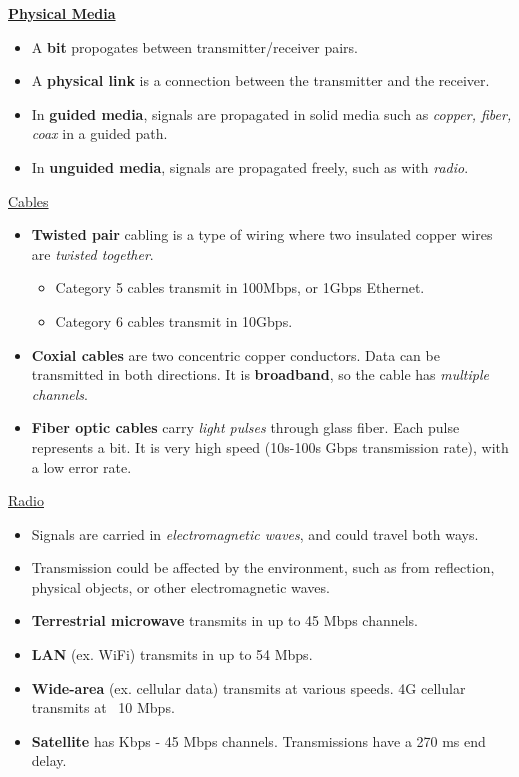 \documentclass{article}
\begin{document}
\underline{\bf Physical Media}

\begin{itemize}
\item A {\bf bit} propogates between transmitter/receiver pairs.
\item A {\bf physical link} is a connection between the transmitter and the receiver.
\item In {\bf guided media}, signals are propagated in solid media such as {\it copper, fiber, coax} in a guided path.
\item In {\bf unguided media}, signals are propagated freely, such as with {\it radio}.
\end{itemize}

\underline{Cables}

\begin{itemize}
\item {\bf Twisted pair} cabling is a type of wiring where two insulated copper wires are {\it twisted together}.
\begin{itemize}
\item Category 5 cables transmit in 100Mbps, or 1Gbps Ethernet.
\item Category 6 cables transmit in 10Gbps.
\end{itemize}
\item {\bf Coxial cables} are two concentric copper conductors. Data can be transmitted in both directions. It is {\bf broadband}, so the cable has {\it multiple channels}.
\item {\bf Fiber optic cables} carry {\it light pulses} through glass fiber. Each pulse represents a bit. It is very high speed (10s-100s Gbps transmission rate), with a low error rate.
\end{itemize}

\underline{Radio}

\begin{itemize}
\item Signals are carried in {\it electromagnetic waves}, and could travel both ways.
\item Transmission could be affected by the environment, such as from reflection, physical objects, or other electromagnetic waves.
\item {\bf Terrestrial microwave} transmits in up to 45 Mbps channels.
\item {\bf LAN} (ex. WiFi) transmits in up to 54 Mbps.
\item {\bf Wide-area} (ex. cellular data) transmits at various speeds. 4G cellular transmits at ~10 Mbps.
\item {\bf Satellite} has Kbps - 45 Mbps channels. Transmissions have a 270 ms end delay.
\end{itemize}
\end{document}
